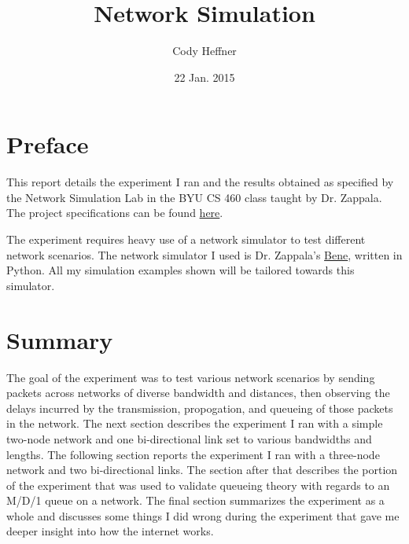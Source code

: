 \documentclass[11pt]{article}
\begin{document}
\lstset{
  language=Python,
  basicstyle=\small,          %
  keywordstyle=\bfseries,
  identifierstyle=,           %
  commentstyle=,              %
  stringstyle=\ttfamily,      %
  showstringspaces=false,     %
  numbers=left,
  numberstyle=\tiny,
  numbersep=5pt,
  frame=tb,
}

\title{Network Simulation}

\author{Cody Heffner}

\date{22 Jan. 2015}

\maketitle

\section{Preface}

This report details the experiment I ran and the results obtained as specified by the Network Simulation Lab in the BYU CS 460 class taught by Dr. Zappala. The project specifications can be found \href{http://cs460.byu.edu/winter-2015/labs/network-simulation}{here}.

The experiment requires heavy use of a network simulator to test different network scenarios. The network simulator I used is Dr. Zappala's \href{https://github.com/zappala/bene}{Bene}, written in Python. All my simulation examples shown will be tailored towards this simulator.

\section{Summary}

The goal of the experiment was to test various network scenarios by sending packets across networks of diverse bandwidth and distances, then observing the delays incurred by the transmission, propogation, and queueing of those packets in the network. The next section describes the experiment I ran with a simple two-node network and one bi-directional link set to various bandwidths and lengths. The following section reports the experiment I ran with a three-node network and two bi-directional links. The section after that describes the portion of the experiment that was used to validate queueing theory with regards to an M/D/1 queue on a network. The final section summarizes the experiment as a whole and discusses some things I did wrong during the experiment that gave me deeper insight into how the internet works.
\end{document}
